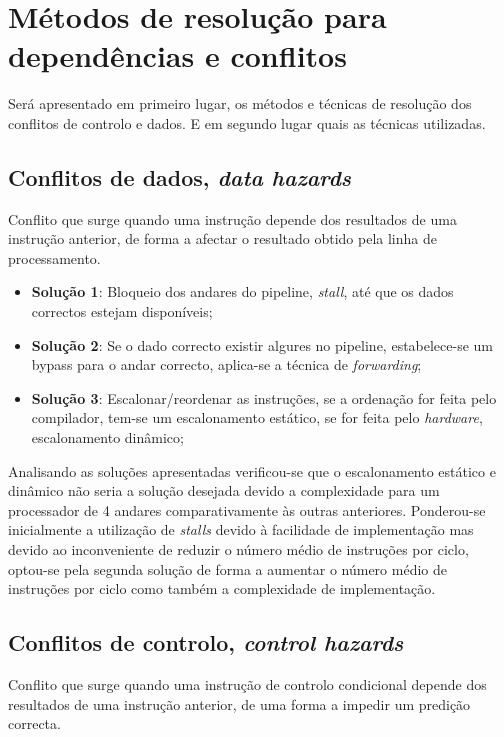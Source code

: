 \documentclass[11pt]{article}
\numberwithin{equation}{section}
\begin{document}
\section{Métodos de resolução para dependências e conflitos}


Será apresentado em primeiro lugar, os métodos e técnicas de resolução dos conflitos de controlo e dados. E em segundo lugar quais as técnicas utilizadas.


\subsection{Conflitos de dados, \textit{data hazards}}

Conflito que surge quando uma instrução depende dos	resultados de uma instrução anterior, de forma a afectar o resultado obtido pela linha de processamento.

\begin{itemize}
	\item \textbf{Solução 1}: Bloqueio dos andares do pipeline, \textit{stall}, até que os dados correctos estejam disponíveis;
	\item \textbf{Solução 2}: Se o dado correcto existir algures no pipeline, estabelece-se um bypass para o andar correcto, aplica-se a técnica de \textit{forwarding};
	\vspace{-2.5mm}
	\item \textbf{Solução 3}: Escalonar/reordenar as instruções, se a ordenação for feita pelo compilador, tem-se um escalonamento estático, se for feita pelo \textit{hardware}, escalonamento dinâmico;
\end{itemize}

\vspace{-2.5mm}
Analisando as soluções apresentadas verificou-se que o escalonamento estático e dinâmico não seria a solução desejada devido a complexidade para um processador de 4 andares comparativamente às outras anteriores. Ponderou-se inicialmente a utilização de \textit{stalls} devido à facilidade de implementação mas devido ao inconveniente de reduzir o número médio de instruções por ciclo, optou-se pela segunda solução de forma a aumentar o número médio de instruções por ciclo como também a complexidade de implementação.


\subsection{Conflitos de controlo, \textit{control hazards}}
Conflito que surge quando uma instrução de controlo condicional depende dos	resultados de uma instrução anterior, de uma forma a impedir um predição correcta.
\end{document}
